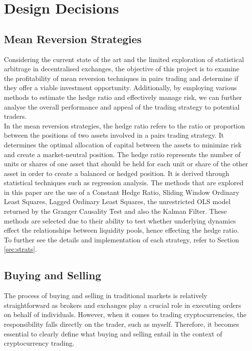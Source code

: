 \chapter{Design Decisions}

\section{Mean Reversion Strategies}
Considering the current state of the art and the limited exploration of statistical arbitrage in decentralised exchanges, the objective of this project is to examine the profitability of mean reversion techniques in pairs trading and determine if they offer a viable investment opportunity. Additionally, by employing various methods to estimate the hedge ratio and effectively manage risk, we can further analyse the overall performance and appeal of the trading strategy to potential traders.
\\[3mm]
In the mean reversion strategies, the hedge ratio refers to the ratio or proportion between the positions of two assets involved in a pairs trading strategy. It determines the optimal allocation of capital between the assets to minimize risk and create a market-neutral position. The hedge ratio represents the number of units or shares of one asset that should be held for each unit or share of the other asset in order to create a balanced or hedged position. It is derived through statistical techniques such as regression analysis. The methods that are explored in this paper are the use of a Constant Hedge Ratio, Sliding Window Ordinary Least Squares, Lagged Ordinary Least Squares, the unrestricted OLS model returned by the Granger Causality Test and also the Kalman Filter. These methods are selected due to their ability to test whether underlying dynamics effect the relationships between liquidity pools, hence effecting the hedge ratio. To further see the details and implementation of each strategy, refer to Section \ref{sec:strats}.

\section{Buying and Selling}
\label{sec:buying-selling}
The process of buying and selling in traditional markets is relatively straightforward as brokers and exchanges play a crucial role in executing orders on behalf of individuals. However, when it comes to trading cryptocurrencies, the responsibility falls directly on the trader, such as myself. Therefore, it becomes essential to clearly define what buying and selling entail in the context of cryptocurrency trading.

